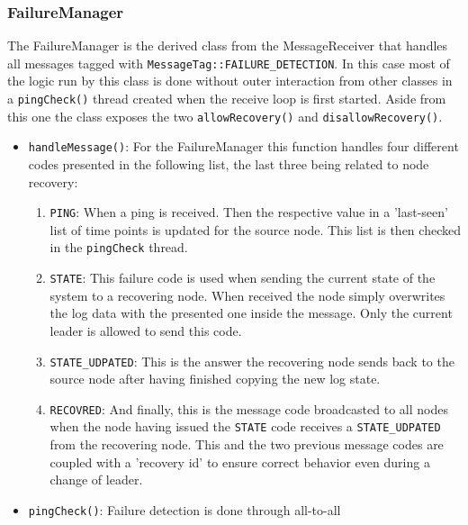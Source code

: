 \documentclass[11pt]{article}
\begin{document}
\subsubsection{FailureManager}
The FailureManager is the derived class from the MessageReceiver that handles
all messages tagged with \texttt{MessageTag::FAILURE\_DETECTION}. In this case
most of the logic run by this class is done without outer interaction from other
classes in a \texttt{pingCheck()} thread created when the receive loop is first
started. Aside from this one the class exposes the two \texttt{allowRecovery()}
and \texttt{disallowRecovery()}.\\
\begin{itemize}
  \item \texttt{handleMessage()}: For the FailureManager this function handles
    four different codes presented in the following list, the last three being
    related to node recovery:\\
    \begin{enumerate}
    \item \texttt{PING}: When a ping is received. Then the respective value in a
      'last-seen' list of time points is updated for the source node. This list
      is then checked in the \texttt{pingCheck} thread.\\
      \item \texttt{STATE}: This failure code is used when sending the current
        state of the system to a recovering node. When received the node simply
        overwrites the log data with the presented one inside the message. Only
        the current leader is allowed to send this code.\\
      \item \texttt{STATE\_UDPATED}: This is the answer the recovering node
        sends back to the source node after having finished copying the new log
        state.\\
      \item \texttt{RECOVRED}: And finally, this is the message code broadcasted
        to all nodes when the node having issued the \texttt{STATE} code
        receives a \texttt{STATE\_UDPATED} from the recovering node. This and
        the two previous message codes are coupled with a 'recovery id' to
        ensure correct behavior even during a change of leader.\\
    \end{enumerate}
\item \texttt{pingCheck()}: Failure detection is done through all-to-all

\end{itemize}
\end{document}
